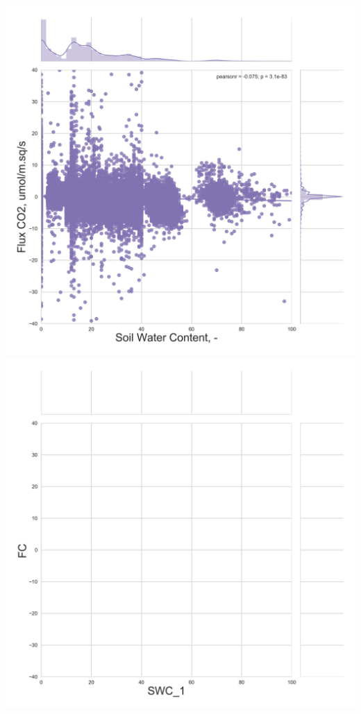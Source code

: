 \documentclass{beamer}
\begin{document}
\begin{frame}
\begin{columns}[t]
\centering
\includegraphics[width=\textwidth]{FvsSWC/US-FPe.png}\\
\includegraphics[width=\textwidth]{FvsSWC/US-Los.png}
\end{columns}

\end{frame}
\end{document}
